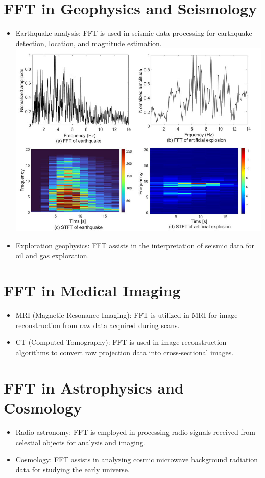 \documentclass[28]{report}
\begin{document}
\section{FFT in Geophysics and Seismology}
    \begin{itemize}[]
        \item Earthquake analysis: FFT is used in seismic data processing for earthquake detection, location, and magnitude estimation.\\
        \includegraphics[scale=0.5]{images/seismic_signal_1.jpg}
        \item Exploration geophysics: FFT assists in the interpretation of seismic data for oil and gas exploration.
    \end{itemize}
\section{FFT in Medical Imaging}
    \begin{itemize}[]
        \item MRI (Magnetic Resonance Imaging): FFT is utilized in MRI for image reconstruction from raw data acquired during scans.
        \item CT (Computed Tomography): FFT is used in image reconstruction algorithms to convert raw projection data into cross-sectional images.
    \end{itemize}
\section{FFT in Astrophysics and Cosmology}
    \begin{itemize}[]
        \item Radio astronomy: FFT is employed in processing radio signals received from celestial objects for analysis and imaging.
        \item Cosmology: FFT assists in analyzing cosmic microwave background radiation data for studying the early universe.
    \end{itemize}
\end{document}
